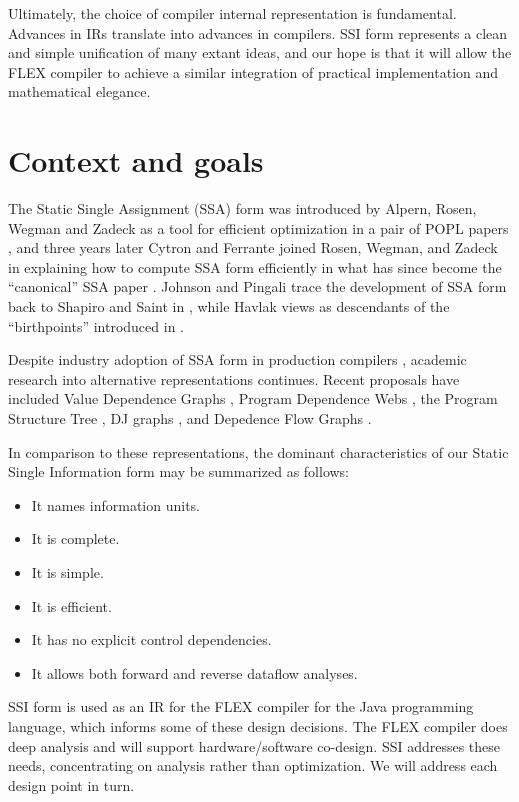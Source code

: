 \documentclass[12pt,titlepage,twoside]{article}
\let\oldsection\section
\renewcommand{\section}{\setcounter{figure}{0}\oldsection}
\begin{document}
Ultimately, the choice of compiler internal representation is fundamental.
Advances in IRs translate into advances in compilers.  SSI form
represents a clean and simple unification of many extant ideas, and
our hope is that it will allow the FLEX compiler to achieve a similar
integration of practical implementation and mathematical elegance.

\section{Context and goals}
The Static Single Assignment (SSA) form was introduced by 
Alpern, Rosen, Wegman and Zadeck
as a tool for efficient optimization in a pair of POPL
papers \cite{alpern88:ssa,rosen88:gvn}, and three years later Cytron
and Ferrante joined Rosen, Wegman, and Zadeck in explaining how to
compute SSA form efficiently in what has since become the 
``canonical'' SSA paper \cite{cytron89:ssa}.  Johnson and Pingali
\cite{johnson93:dfg} trace the development of SSA form back to Shapiro
and Saint in \cite{shapiro70:ssa}, while Havlak \cite{havlak94:isa}
views  as descendants of the ``birthpoints'' introduced
in \cite{reif81:sym}.

Despite industry adoption of SSA form in production compilers
\cite{chow97:ssapre,chow96:hssa}, academic research into alternative
representations continues.
Recent proposals have included Value Dependence Graphs
\cite{weise94:vdg}, Program Dependence Webs \cite{ballance90:pdw},
the Program Structure Tree \cite{johnson94:pst},
DJ graphs \cite{sreedhar96:dj}, and Depedence Flow Graphs
\cite{johnson93:dfg}.

In comparison to these representations, the dominant characteristics of
our Static Single Information form may be summarized as follows:
\begin{itemize}
\item It names information units.
\item It is complete.
\item It is simple.
\item It is efficient.
\item It has no explicit control dependencies.
\item It allows both forward and reverse dataflow analyses.
\end{itemize}
SSI form is used as an IR for the FLEX compiler for the Java
programming language, which informs some of these design decisions.
The FLEX compiler does deep analysis and will support
hardware/software co-design.  SSI addresses these needs, concentrating
on analysis rather than optimization.  We will address each design
point in turn.
\end{document}
